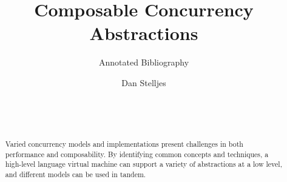 \documentclass{sig-alternate}
\author{
\alignauthor{}
Dan Stelljes\\
  \affaddr{Division of Science and Mathematics}\\
  \affaddr{University of Minnesota, Morris}\\
  \affaddr{Morris, Minnesota, USA 56267}\\
  \email{stell124@morris.umn.edu}
}
\title{Composable Concurrency Abstractions}
\subtitle{Annotated Bibliography}
\begin{document}
\maketitle

\begin{abstract}
Varied concurrency models and implementations present challenges in both performance and composability. By identifying common concepts and techniques, a high-level language virtual machine can support a variety of abstractions at a low level, and different models can be used in tandem.
\end{abstract}

\nocite{*}



\end{document}
